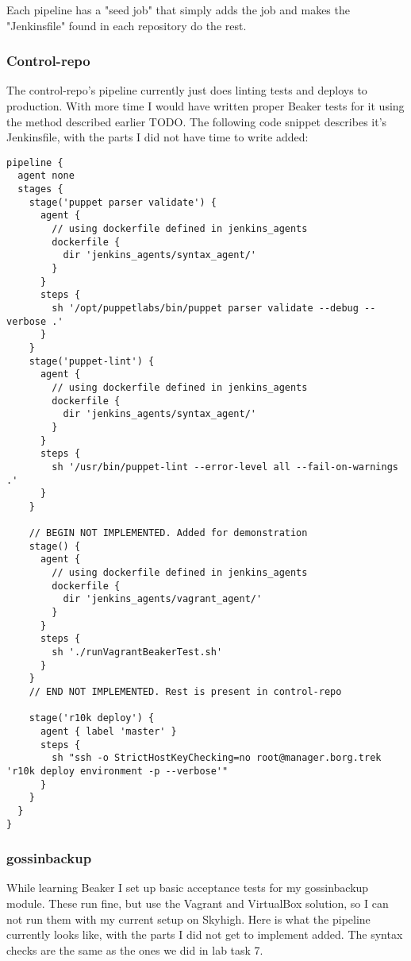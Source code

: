 Each pipeline has a "seed job" that simply adds the job and makes the "Jenkinsfile" found in each repository do the rest. 

\subsubsection{Control-repo}

The control-repo's pipeline currently just does linting tests and deploys to production. With more time I would have written proper Beaker tests for it using the method described earlier TODO. The following code snippet describes it's Jenkinsfile, with the parts I did not have time to write added:

\begin{verbatim}
pipeline {
  agent none
  stages {
    stage('puppet parser validate') {
      agent {
        // using dockerfile defined in jenkins_agents
        dockerfile {
          dir 'jenkins_agents/syntax_agent/'
        }
      }
      steps {
        sh '/opt/puppetlabs/bin/puppet parser validate --debug --verbose .'
      }
    }
    stage('puppet-lint') {
      agent {
        // using dockerfile defined in jenkins_agents
        dockerfile {
          dir 'jenkins_agents/syntax_agent/'
        }
      }
      steps {
        sh '/usr/bin/puppet-lint --error-level all --fail-on-warnings .'
      }
    }
    
    // BEGIN NOT IMPLEMENTED. Added for demonstration
    stage() {
      agent {
        // using dockerfile defined in jenkins_agents
        dockerfile {
          dir 'jenkins_agents/vagrant_agent/'
        }
      }
      steps {
        sh './runVagrantBeakerTest.sh'
      }
    }    
    // END NOT IMPLEMENTED. Rest is present in control-repo

    stage('r10k deploy') {
      agent { label 'master' }
      steps {
        sh "ssh -o StrictHostKeyChecking=no root@manager.borg.trek 'r10k deploy environment -p --verbose'"
      }
    }
  }
}
\end{verbatim}




\subsubsection{gossinbackup}

While learning Beaker I set up basic acceptance tests for my gossinbackup module. These run fine, but use the Vagrant and VirtualBox solution, so I can not run them with my current setup on Skyhigh. Here is what the pipeline currently looks like, with the parts I did not get to implement added. The syntax checks are the same as the ones we did in lab task 7.

